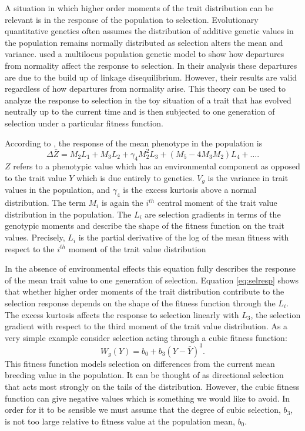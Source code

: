 A situation in which higher order moments of the trait distribution can be
relevant is in the response of the population to selection. Evolutionary
quantitative genetics often assumes the distribution of additive genetic values
in the population remains normally distributed as selection alters the mean and
variance. \citet{Turelli1990} used a multilocus population genetic model to show
how departures from normality affect the response to selection. In their
analysis these departures are due to the build up of linkage disequilibrium.
However, their results are valid regardless of how departures from normality
arise. This theory can be used to analyze the response to selection in the toy
situation of a trait that has evolved neutrally up to the current time and is
then subjected to one generation of selection under a particular fitness
function.

According to \citet{Turelli1990}, the response of the mean phenotype in the
population is
\begin{equation}
  \label{eq:selresp}
  \Delta \bar{Z} = M_2L_1 + M_3L_2 + \gamma_4M^2_2L_3 +
  \left( M_5-4M_3M_2\right)L_4 + \ldots.
\end{equation}
$Z$ refers to a phenotypic value which has an environmental component as opposed
to the trait value $Y$ which is due entirely to genetics. $V_g$ is the variance
in trait values in the population, and $\gamma_4$ is the excess kurtosis above a
normal distribution. The term $M_i$ is again the $i^{th}$ central moment of the
trait value distribution in the population. The $L_i$ are selection gradients in
terms of the genotypic moments and describe the shape of the fitness function on
the trait values. Precisely, $L_i$ is the partial derivative of the log of the
mean fitness with respect to the $i^{th}$ moment of the trait value distribution

In the absence of environmental effects this equation fully describes the
response of the mean trait value to one generation of selection.
Equation \eqref{eq:selresp} shows that whether higher order moments of the trait
distribution contribute to the selection response depends on the shape of the
fitness function through the $L_i$. The excess kurtosis affects the response to
selection linearly with $L_3$, the selection gradient with respect to the third
moment of the trait value distribution. As a very simple example consider
selection acting through a cubic fitness function:
\begin{equation}
  \label{eq:cubsel}
  W_g(Y) = b_0 + b_3(Y-\bar{Y})^3.
\end{equation}
This fitness function models selection on differences from the current mean
breeding value in the population. It can be thought of as directional selection
that acts most strongly on the tails of the distribution. However, the cubic
fitness function can give negative values which is something we would like to
avoid. In order for it to be sensible we must assume that the degree of cubic
selection, $b_3$, is not too large relative to fitness value at the population
mean, $b_0$.

